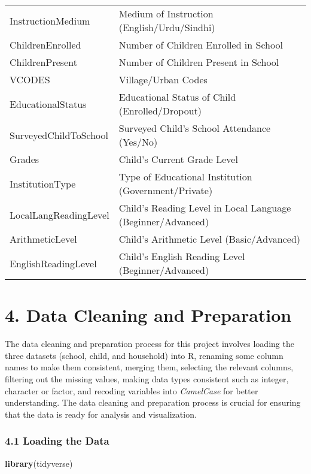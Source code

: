 \documentclass[
]{article}
\newenvironment{Shaded}{\begin{snugshade}}{\end{snugshade}}
\newcommand{\FunctionTok}[1]{\textcolor[rgb]{0.13,0.29,0.53}{\textbf{#1}}}
\newcommand{\NormalTok}[1]{#1}
\begin{document}
\begin{longtable}[]{@{}
  >{\raggedright\arraybackslash}p{}
  >{\raggedright\arraybackslash}p{}@{}}
InstructionMedium & Medium of Instruction (English/Urdu/Sindhi) \\
ChildrenEnrolled & Number of Children Enrolled in School \\
ChildrenPresent & Number of Children Present in School \\
VCODES & Village/Urban Codes \\
EducationalStatus & Educational Status of Child (Enrolled/Dropout) \\
SurveyedChildToSchool & Surveyed Child's School Attendance (Yes/No) \\
Grades & Child's Current Grade Level \\
InstitutionType & Type of Educational Institution
(Government/Private) \\
LocalLangReadingLevel & Child's Reading Level in Local Language
(Beginner/Advanced) \\
ArithmeticLevel & Child's Arithmetic Level (Basic/Advanced) \\
EnglishReadingLevel & Child's English Reading Level
(Beginner/Advanced) \\
\end{longtable}

\section{4. Data Cleaning and
Preparation}\label{data-cleaning-and-preparation}

The data cleaning and preparation process for this project involves
loading the three datasets (school, child, and household) into R,
renaming some column names to make them consistent, merging them,
selecting the relevant columns, filtering out the missing values, making
data types consistent such as integer, character or factor, and recoding
variables into \emph{CamelCase} for better understanding. The data
cleaning and preparation process is crucial for ensuring that the data
is ready for analysis and visualization.

\subsubsection{4.1 Loading the Data}\label{loading-the-data}

\begin{Shaded}
\begin{Highlighting}[]
\FunctionTok{library}\NormalTok{(tidyverse)}
\end{Highlighting}
\end{Shaded}
\end{document}
